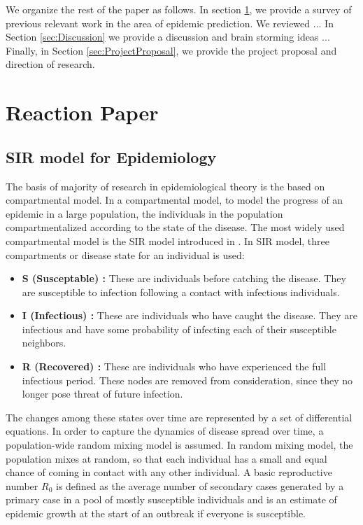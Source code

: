 \documentclass[12pt, journal,onecolumn]{IEEEtran}
\begin{document}
We organize the rest of the paper as follows. In section \ref{sec:ReactionPaper}, we provide a survey of previous relevant work in the area of epidemic prediction. We reviewed ...
In Section \ref{sec:Discussion} we provide a discussion and brain storming ideas ...
Finally, in Section \ref{sec:ProjectProposal}, we provide the project proposal and direction of research.

\section{Reaction Paper}
\label{sec:ReactionPaper}
\subsection{SIR model for Epidemiology}
\label{SubSec:SIR}
The basis of majority of research in epidemiological theory is the based on compartmental model. In a compartmental model, to model the progress of an epidemic in a large population, the individuals in the population compartmentalized according to the state of the disease. The most widely used compartmental model is the SIR model introduced in \cite{very_old_paper}. In SIR model, three compartments or disease state for an individual is used:

\begin{itemize}
\item \textbf{S (Susceptable) : } These are individuals before catching the disease. They are susceptible to infection following a contact with infectious individuals.
\item \textbf{I (Infectious) : }These are individuals who have caught the disease. They are infectious and have some probability of infecting each of their susceptible neighbors.
\item \textbf{R (Recovered) : }These are individuals who have experienced the full infectious period. These nodes are removed from consideration, since they no longer pose threat of future infection.
\end{itemize}

The changes among these states over time are represented by a set of differential equations. In order to capture the dynamics of disease spread over time, a population-wide random mixing model is assumed. In random mixing model, the population mixes at random, so that each individual has a small and equal chance of coming in contact with any other individual. A basic reproductive number $R_0$ is defined as the average number of secondary cases generated by a primary case in a pool of mostly susceptible individuals and is an estimate of epidemic growth at the start of an outbreak if everyone is susceptible.
\end{document}
